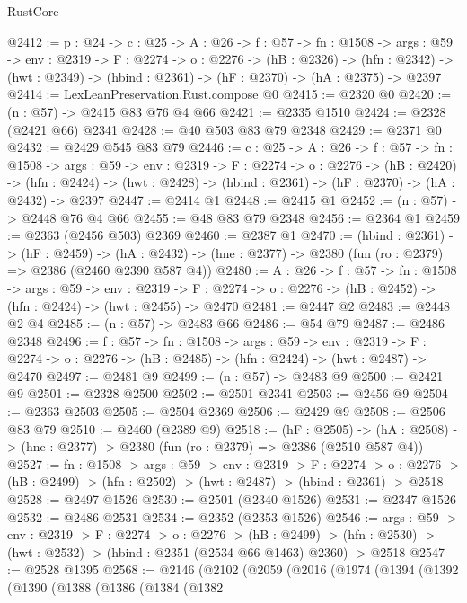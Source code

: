 \begin{lexlean}{RustCore}
\begin{coremodule}
@2412 := {p : @24} ->
  {c : @25} ->
  {A : @26} ->
  {f : @57} ->
  {fn : @1508} ->
  {args : @59} ->
  {env : @2319} ->
  {F : @2274} ->
  {o : @2276} ->
  (hB : @2326) ->
  (hfn : @2342) -> (hwt : @2349) -> (hbind : @2361) -> (hF : @2370) -> (hA : @2375) -> @2397
@2414 := LexLeanPreservation.Rust.compose @0
@2415 := @2320 @0
@2420 := (n : @57) -> @2415 @83 @76 @4 @66
@2421 := @2335 @1510
@2424 := @2328 (@2421 @66) @2341
@2428 := @40 @503 @83 @79 @2348
@2429 := @2371 @0
@2432 := @2429 @545 @83 @79
@2446 := {c : @25} ->
  {A : @26} ->
  {f : @57} ->
  {fn : @1508} ->
  {args : @59} ->
  {env : @2319} ->
  {F : @2274} ->
  {o : @2276} ->
  (hB : @2420) ->
  (hfn : @2424) -> (hwt : @2428) -> (hbind : @2361) -> (hF : @2370) -> (hA : @2432) -> @2397
@2447 := @2414 @1
@2448 := @2415 @1
@2452 := (n : @57) -> @2448 @76 @4 @66
@2455 := @48 @83 @79 @2348
@2456 := @2364 @1
@2459 := @2363 (@2456 @503) @2369
@2460 := @2387 @1
@2470 := (hbind : @2361) ->
  (hF : @2459) ->
  (hA : @2432) -> (hne : @2377) -> @2380 (fun (ro : @2379) => @2386 (@2460 @2390 @587 @4))
@2480 := {A : @26} ->
  {f : @57} ->
  {fn : @1508} ->
  {args : @59} ->
  {env : @2319} ->
  {F : @2274} -> {o : @2276} -> (hB : @2452) -> (hfn : @2424) -> (hwt : @2455) -> @2470
@2481 := @2447 @2
@2483 := @2448 @2 @4
@2485 := (n : @57) -> @2483 @66
@2486 := @54 @79
@2487 := @2486 @2348
@2496 := {f : @57} ->
  {fn : @1508} ->
  {args : @59} ->
  {env : @2319} ->
  {F : @2274} -> {o : @2276} -> (hB : @2485) -> (hfn : @2424) -> (hwt : @2487) -> @2470
@2497 := @2481 @9
@2499 := (n : @57) -> @2483 @9
@2500 := @2421 @9
@2501 := @2328 @2500
@2502 := @2501 @2341
@2503 := @2456 @9
@2504 := @2363 @2503
@2505 := @2504 @2369
@2506 := @2429 @9
@2508 := @2506 @83 @79
@2510 := @2460 (@2389 @9)
@2518 := (hF : @2505) ->
  (hA : @2508) -> (hne : @2377) -> @2380 (fun (ro : @2379) => @2386 (@2510 @587 @4))
@2527 := {fn : @1508} ->
  {args : @59} ->
  {env : @2319} ->
  {F : @2274} ->
  {o : @2276} -> (hB : @2499) -> (hfn : @2502) -> (hwt : @2487) -> (hbind : @2361) -> @2518
@2528 := @2497 @1526
@2530 := @2501 (@2340 @1526)
@2531 := @2347 @1526
@2532 := @2486 @2531
@2534 := @2352 (@2353 @1526)
@2546 := {args : @59} ->
  {env : @2319} ->
  {F : @2274} ->
  {o : @2276} ->
  (hB : @2499) -> (hfn : @2530) -> (hwt : @2532) -> (hbind : @2351 (@2534 @66 @1463) @2360) -> @2518
@2547 := @2528 @1395
@2568 := @2146
    (@2102
      (@2059
        (@2016
          (@1974
            (@1394
              (@1392
                (@1390
                  (@1388
                    (@1386
                      (@1384
                        (@1382

\end{coremodule}
\end{lexlean}

